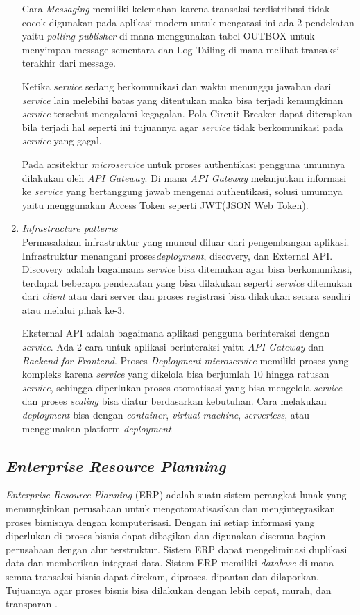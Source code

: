 \begin{enumerate}[leftmargin=1.3cm]
	Cara \textit{Messaging} memiliki kelemahan karena transaksi terdistribusi tidak cocok digunakan pada aplikasi modern untuk mengatasi ini ada 2 pendekatan yaitu \textit{polling publisher} di mana menggunakan tabel OUTBOX untuk menyimpan message sementara dan Log Tailing di mana melihat transaksi terakhir dari message.

	Ketika \textit{service} sedang berkomunikasi dan waktu menunggu jawaban dari \textit{service} lain melebihi batas yang ditentukan maka bisa terjadi kemungkinan \textit{service} tersebut mengalami kegagalan. Pola Circuit Breaker dapat diterapkan bila terjadi hal seperti ini tujuannya agar \textit{service} tidak berkomunikasi pada \textit{service} yang gagal.

	Pada arsitektur \textit{microservice} untuk proses authentikasi pengguna umumnya dilakukan oleh \textit{API Gateway}. Di mana \textit{API Gateway} melanjutkan informasi ke \textit{service} yang bertanggung jawab mengenai authentikasi, solusi umumnya yaitu menggunakan Access Token seperti JWT(JSON Web Token).
	\item \textit{Infrastructure patterns}\\
	Permasalahan infrastruktur yang muncul diluar dari pengembangan aplikasi. Infrastruktur menangani proses\textit{deployment}, discovery, dan External API. 
	Discovery adalah bagaimana \textit{service} bisa ditemukan agar bisa berkomunikasi, terdapat beberapa pendekatan yang bisa dilakukan seperti \textit{service} ditemukan dari \textit{client} atau dari server dan proses registrasi bisa dilakukan secara sendiri atau melalui pihak ke-3.

	Eksternal API adalah bagaimana aplikasi pengguna berinteraksi dengan \textit{service}.
	Ada 2 cara untuk aplikasi berinteraksi yaitu \textit{API Gateway} dan \textit{Backend for Frontend}. Proses \textit{Deployment} \textit{microservice} memiliki proses yang kompleks karena \textit{service} yang dikelola bisa berjumlah 10 hingga ratusan \textit{service}, sehingga diperlukan proses otomatisasi yang bisa mengelola \textit{service} dan proses \textit{scaling} bisa diatur berdasarkan kebutuhan. Cara melakukan \textit{deployment} bisa dengan \textit{container}, \textit{virtual machine}, \textit{serverless}, atau menggunakan platform \textit{deployment} \\	
\end{enumerate}	

\subsection{\textit{Enterprise Resource Planning}}
\textit{Enterprise Resource Planning} (ERP) adalah suatu sistem perangkat lunak yang memungkinkan perusahaan untuk mengotomatisasikan dan mengintegrasikan proses bisnisnya dengan komputerisasi. Dengan ini setiap informasi yang diperlukan di proses bisnis dapat dibagikan dan digunakan disemua bagian perusahaan dengan alur terstruktur. Sistem ERP dapat mengeliminasi duplikasi data dan memberikan integrasi data. Sistem ERP memiliki \textit{database} di mana semua transaksi bisnis dapat direkam, diproses, dipantau dan dilaporkan. Tujuannya agar proses bisnis bisa dilakukan dengan lebih cepat, murah, dan transparan \cite{D94}.


